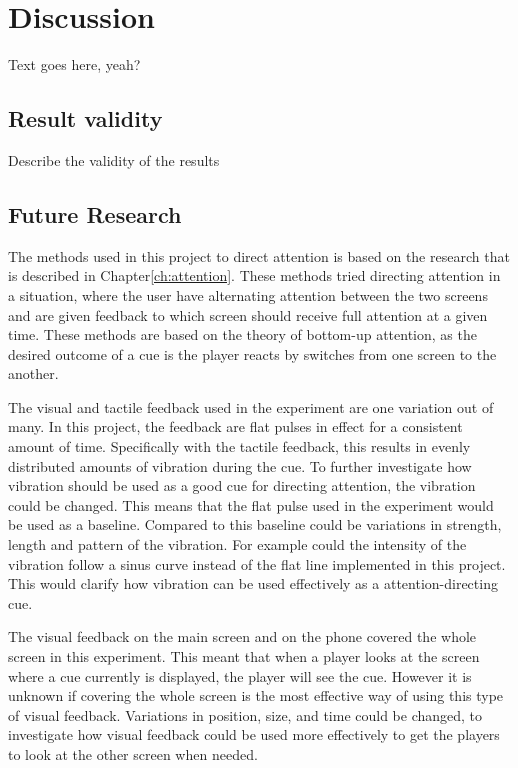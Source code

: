 \chapter{Discussion}\label{ch:discussion}
Text goes here, yeah?

\section{Result validity}\label{sec:result_validity}
Describe the validity of the results

\section{Future Research}\label{sec:future_research}
The methods used in this project to direct attention is based on the research that is described in Chapter\ref{ch:attention}. These methods tried directing attention in a situation, where the user have alternating attention between the two screens and are given feedback to which screen should receive full attention at a given time. These methods are based on the theory of bottom-up attention, as the desired outcome of a cue is the player reacts by switches from one screen to the another.

The visual and tactile feedback used in the experiment are one variation out of many. In this project, the feedback are flat pulses in effect for a consistent amount of time. Specifically with the tactile feedback, this results in evenly distributed amounts of vibration during the cue. To further investigate how vibration should be used as a good cue for directing attention, the vibration could be changed. This means that the flat pulse used in the experiment would be used as a baseline. Compared to this baseline could be variations in strength, length and pattern of the vibration. For example could the intensity of the vibration follow a sinus curve instead of the flat line implemented in this project. This would clarify how vibration can be used effectively as a attention-directing cue.

The visual feedback on the main screen and on the phone covered the whole screen in this experiment. This meant that when a player looks at the screen where a cue currently is displayed, the player will see the cue. However it is unknown if covering the whole screen is the most effective way of using this type of visual feedback. Variations in position, size, and time could be changed, to investigate how visual feedback could be used more effectively to get the players to look at the other screen when needed.

